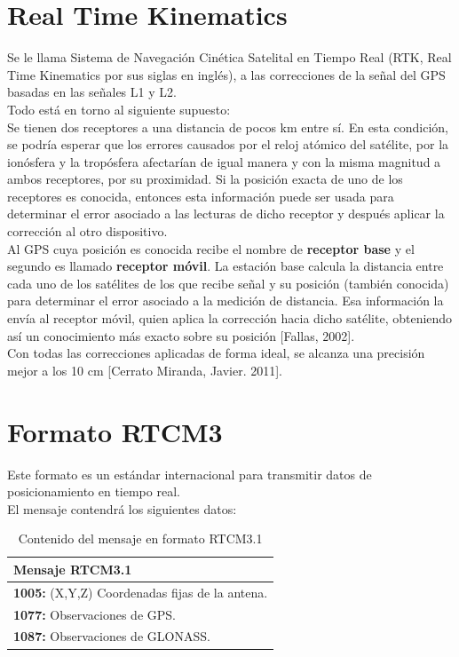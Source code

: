 \section{Real Time Kinematics}

Se le llama Sistema de Navegación Cinética Satelital en Tiempo Real (RTK, Real Time Kinematics por sus siglas en inglés), a las correcciones de la señal del GPS basadas en las señales L1 y L2. \\

Todo está en torno al siguiente supuesto: \\

Se tienen dos receptores a una distancia de pocos km entre sí. En esta condición, se podría esperar que los errores causados por el reloj atómico del satélite, por la ionósfera y la tropósfera afectarían de igual manera y con la misma magnitud a ambos receptores, por su proximidad. Si la posición exacta de uno de los receptores es conocida, entonces esta información puede ser usada para determinar el error asociado a las lecturas de dicho receptor y después aplicar la corrección al otro dispositivo. \\

Al GPS cuya posición es conocida recibe el nombre de \textbf{receptor base} y el segundo es llamado \textbf{receptor móvil}. La estación base calcula la distancia entre cada uno de los satélites de los que recibe señal y su posición (también conocida) para determinar el error asociado a la medición de distancia. Esa información la envía al receptor móvil, quien aplica la corrección hacia dicho satélite, obteniendo así un conocimiento más exacto sobre su posición [Fallas, 2002]. \\

Con todas las correcciones aplicadas de forma ideal, se alcanza una precisión mejor a los 10 cm [Cerrato Miranda, Javier. 2011].

\section{Formato RTCM3}

Este formato es un estándar internacional para transmitir datos de posicionamiento en tiempo real. \\

El mensaje contendrá los siguientes datos: \\

\begin{table}[!htb]
\begin{center}
\caption{Contenido del mensaje en formato RTCM3.1}
\begin{tabular}{|l|}
	\hline
	\textbf{Mensaje RTCM3.1}\\
	\hline
	\tabitem \textbf{1005:} (X,Y,Z) Coordenadas fijas de la antena. \\
	\tabitem \textbf{1077:} Observaciones de GPS. \\
	\tabitem \textbf{1087:} Observaciones de GLONASS.\footnotemark \\
	\hline
\end{tabular}
\end{center}
\end{table}

